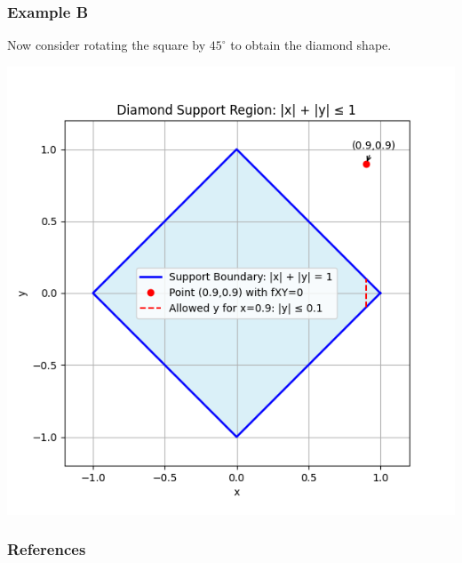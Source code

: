\documentclass{beamer}
\begin{document}
\begin{frame}
    \frametitle{Example B}
Now consider rotating the square by \(45^{\circ}\) to obtain the diamond shape.

\includegraphics[scale=0.5]{Figures/fig_10.png}
\end{frame}
\begin{frame}
    \frametitle{References}
\end{frame}
\end{document}

